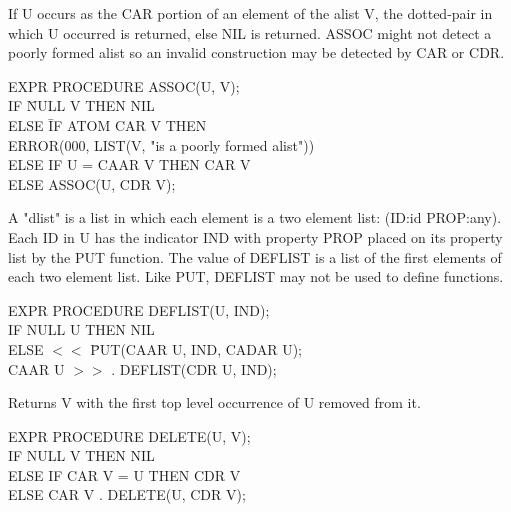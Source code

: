 \documentclass[11pt,letterpaper]{book}
\begin{document}
{If U occurs as the CAR portion of an element of the alist V, the
dotted-pair in which U occurred is returned, else NIL is returned.
ASSOC might not detect a poorly formed alist so an invalid
 
construction may be detected by CAR or CDR.

{\tt \begin{tabbing} EXPR PROCEDURE ASSOC(U, V); \\
\hspace*{1em} IF \= NULL V THEN NIL \\
\> ELSE \= IF ATOM CAR V THEN \\
\> \> ERROR(000, LIST(V, "is a poorly formed alist")) \\
\> ELSE IF U = CAAR V THEN CAR V \\
\> ELSE ASSOC(U, CDR V);
\end{tabbing}}
}

{A "dlist" is a list in which each element is a two element list:
(ID:id PROP:any). Each ID in U has the indicator IND with property
PROP placed on its property list by the PUT function. The value of
DEFLIST is a list of the first elements of each two element list.
Like PUT, DEFLIST may not be used to define functions.

{\tt \begin{tabbing} EXPR PROCEDURE DEFLIST(U, IND); \\
\hspace*{1em} IF NULL U THEN NIL \\
\hspace*{2em} ELSE $<<$ \= PUT(CAAR U, IND, CADAR U); \\
\> CAAR U $>>$ . DEFLIST(CDR U, IND);
\end{tabbing}}
}

{Returns V with the first top level occurrence of U removed from it.

{\tt \begin{tabbing} EXPR PROCEDURE DELETE(U, V); \\
\hspace*{1em} IF NULL V THEN NIL \\
\hspace*{2em} ELSE IF CAR V = U THEN CDR V \\
\hspace*{2em} ELSE CAR V . DELETE(U, CDR V);
\end{tabbing}}}
\end{document}

